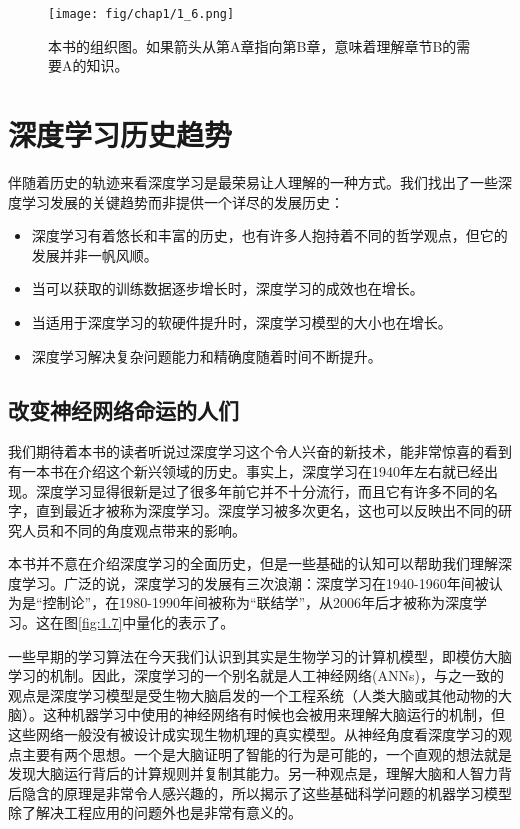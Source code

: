 \begin{figure}[htbp] %
   \centering
   \texttt{[image: fig/chap1/1\_6.png]} 
   \caption{本书的组织图。如果箭头从第A章指向第B章，意味着理解章节B的需要A的知识。}
   \label{fig:1.6}
\end{figure}


\section{深度学习历史趋势}
伴随着历史的轨迹来看深度学习是最荣易让人理解的一种方式。我们找出了一些深度学习发展的关键趋势而非提供一个详尽的发展历史：

\begin{itemize}
\item 深度学习有着悠长和丰富的历史，也有许多人抱持着不同的哲学观点，但它的发展并非一帆风顺。
\item 当可以获取的训练数据逐步增长时，深度学习的成效也在增长。
\item 当适用于深度学习的软硬件提升时，深度学习模型的大小也在增长。
\item 深度学习解决复杂问题能力和精确度随着时间不断提升。
\end{itemize}

\subsection{改变神经网络命运的人们}
我们期待着本书的读者听说过深度学习这个令人兴奋的新技术，能非常惊喜的看到有一本书在介绍这个新兴领域的历史。事实上，深度学习在1940年左右就已经出现。深度学习显得很新是过了很多年前它并不十分流行，而且它有许多不同的名字，直到最近才被称为深度学习。深度学习被多次更名，这也可以反映出不同的研究人员和不同的角度观点带来的影响。


本书并不意在介绍深度学习的全面历史，但是一些基础的认知可以帮助我们理解深度学习。广泛的说，深度学习的发展有三次浪潮：深度学习在1940-1960年间被认为是“控制论”，在1980-1990年间被称为“联结学”，从2006年后才被称为深度学习。这在图\ref{fig:1.7}中量化的表示了。


一些早期的学习算法在今天我们认识到其实是生物学习的计算机模型，即模仿大脑学习的机制。因此，深度学习的一个别名就是人工神经网络(ANNs)，与之一致的观点是深度学习模型是受生物大脑启发的一个工程系统（人类大脑或其他动物的大脑）。这种机器学习中使用的神经网络有时候也会被用来理解大脑运行的机制，但这些网络一般没有被设计成实现生物机理的真实模型。从神经角度看深度学习的观点主要有两个思想。一个是大脑证明了智能的行为是可能的，一个直观的想法就是发现大脑运行背后的计算规则并复制其能力。另一种观点是，理解大脑和人智力背后隐含的原理是非常令人感兴趣的，所以揭示了这些基础科学问题的机器学习模型除了解决工程应用的问题外也是非常有意义的。


